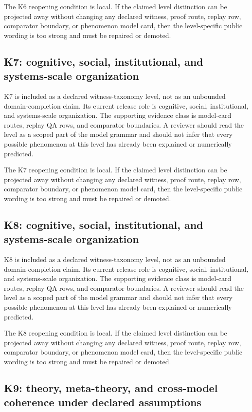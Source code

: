 The K6 reopening condition is local. If the claimed level distinction can be projected away without changing any declared witness, proof route, replay row, comparator boundary, or phenomenon model card, then the level-specific public wording is too strong and must be repaired or demoted.


\subsection{K7: cognitive, social, institutional, and systems-scale organization}

K7 is included as a declared witness-taxonomy level, not as an unbounded domain-completion claim. Its current release role is cognitive, social, institutional, and systems-scale organization. The supporting evidence class is model-card routes, replay QA rows, and comparator boundaries. A reviewer should read the level as a scoped part of the model grammar and should not infer that every possible phenomenon at this level has already been explained or numerically predicted.


The K7 reopening condition is local. If the claimed level distinction can be projected away without changing any declared witness, proof route, replay row, comparator boundary, or phenomenon model card, then the level-specific public wording is too strong and must be repaired or demoted.


\subsection{K8: cognitive, social, institutional, and systems-scale organization}

K8 is included as a declared witness-taxonomy level, not as an unbounded domain-completion claim. Its current release role is cognitive, social, institutional, and systems-scale organization. The supporting evidence class is model-card routes, replay QA rows, and comparator boundaries. A reviewer should read the level as a scoped part of the model grammar and should not infer that every possible phenomenon at this level has already been explained or numerically predicted.


The K8 reopening condition is local. If the claimed level distinction can be projected away without changing any declared witness, proof route, replay row, comparator boundary, or phenomenon model card, then the level-specific public wording is too strong and must be repaired or demoted.


\subsection{K9: theory, meta-theory, and cross-model coherence under declared assumptions}

